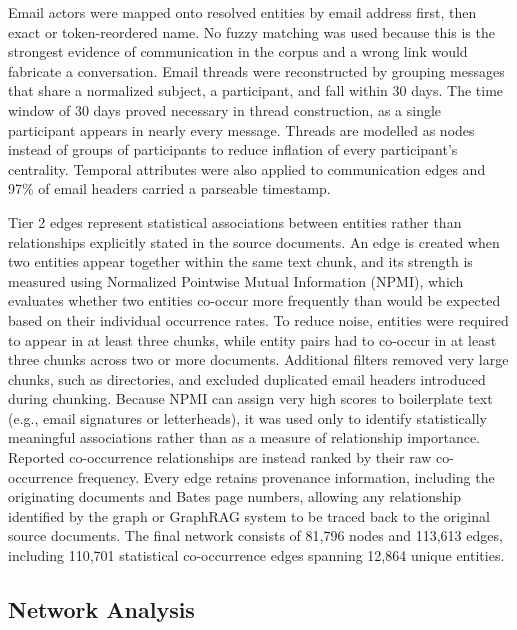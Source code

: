 \documentclass[
  letterpaper,
  DIV=11,
  numbers=noendperiod]{scrartcl}
\begin{document}
Email actors were mapped onto resolved entities by email address first,
then exact or token-reordered name. No fuzzy matching was used because
this is the strongest evidence of communication in the corpus and a
wrong link would fabricate a conversation. Email threads were
reconstructed by grouping messages that share a normalized subject, a
participant, and fall within 30 days. The time window of 30 days proved
necessary in thread construction, as a single participant appears in
nearly every message. Threads are modelled as nodes instead of groups of
participants to reduce inflation of every participant's centrality.
Temporal attributes were also applied to communication edges and 97\% of
email headers carried a parseable timestamp.

Tier 2 edges represent statistical associations between entities rather
than relationships explicitly stated in the source documents. An edge is
created when two entities appear together within the same text chunk,
and its strength is measured using Normalized Pointwise Mutual
Information (NPMI), which evaluates whether two entities co-occur more
frequently than would be expected based on their individual occurrence
rates. To reduce noise, entities were required to appear in at least
three chunks, while entity pairs had to co-occur in at least three
chunks across two or more documents. Additional filters removed very
large chunks, such as directories, and excluded duplicated email headers
introduced during chunking. Because NPMI can assign very high scores to
boilerplate text (e.g., email signatures or letterheads), it was used
only to identify statistically meaningful associations rather than as a
measure of relationship importance. Reported co-occurrence relationships
are instead ranked by their raw co-occurrence frequency. Every edge
retains provenance information, including the originating documents and
Bates page numbers, allowing any relationship identified by the graph or
GraphRAG system to be traced back to the original source documents. The
final network consists of 81,796 nodes and 113,613 edges, including
110,701 statistical co-occurrence edges spanning 12,864 unique entities.

\subsection{Network Analysis}\label{network-analysis}
\end{document}
